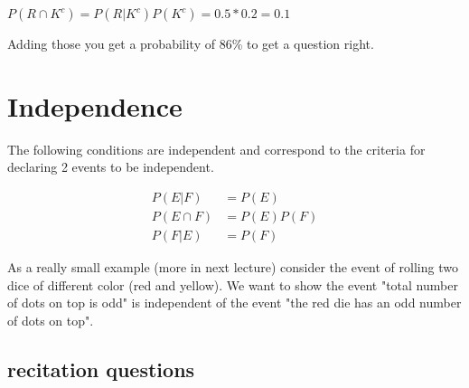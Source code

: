 \documentclass[12pt]{article}
\begin{document}
$P(R \cap K^c) = P(R|K^c)P(K^c) = 0.5 * 0.2 = 0.1$

Adding those you get a probability of 86\% to get a question right.

\section*{Independence}

The following conditions are independent and correspond to the criteria for declaring 2 events to be independent.

\begin{align*}
P(E|F) &= P(E) \\
P(E \cap F) &= P(E)P(F) \\
P(F|E) &= P(F)
\end{align*}

\medskip

As a really small example (more in next lecture) consider the event of rolling two dice of different color (red and yellow). We want to show the event "total number of dots on top is odd" is independent of the event "the red die has an odd number of dots on top".


\subsection*{recitation questions}
\end{document}
